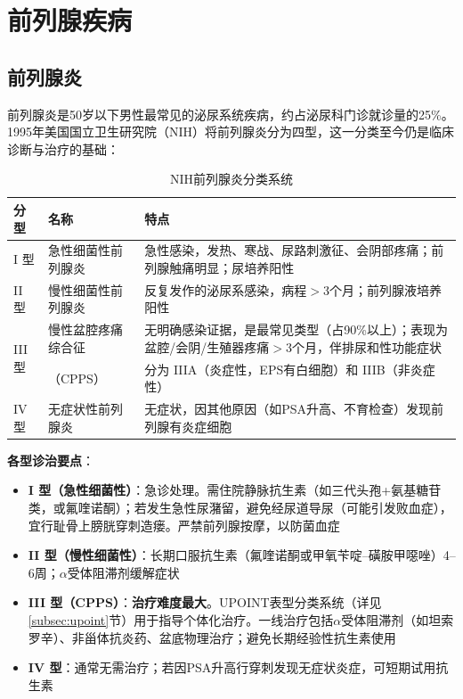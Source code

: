 \section{前列腺疾病}

\subsection{前列腺炎}

前列腺炎是50岁以下男性最常见的泌尿系统疾病，约占泌尿科门诊就诊量的25\%。1995年美国国立卫生研究院（NIH）将前列腺炎分为四型，这一分类至今仍是临床诊断与治疗的基础：

\begin{table}[htbp]
\centering
\caption{NIH前列腺炎分类系统}
\label{tab:prostatitis_nih}
\begin{tabularx}{\textwidth}{@{}llX@{}}
    \toprule
    \textbf{分型} & \textbf{名称} & \textbf{特点} \\
    \midrule
    I 型 & 急性细菌性前列腺炎 & 急性感染，发热、寒战、尿路刺激征、会阴部疼痛；前列腺触痛明显；尿培养阳性 \\
    II 型 & 慢性细菌性前列腺炎 & 反复发作的泌尿系感染，病程$>$3个月；前列腺液培养阳性 \\
    \multirow{2}{*}{III 型} & 慢性盆腔疼痛综合征 & 无明确感染证据，是最常见类型（占90\%以上）；表现为盆腔/会阴/生殖器疼痛$>$3个月，伴排尿和性功能症状 \\
     & （CPPS） & 分为 IIIA（炎症性，EPS有白细胞）和 IIIB（非炎症性） \\
    IV 型 & 无症状性前列腺炎 & 无症状，因其他原因（如PSA升高、不育检查）发现前列腺有炎症细胞 \\
    \bottomrule
\end{tabularx}
\end{table}

\textbf{各型诊治要点}：

\begin{itemize}[leftmargin=2cm]
	\item \textbf{I 型（急性细菌性）}：急诊处理。需住院静脉抗生素（如三代头孢+氨基糖苷类，或氟喹诺酮）；若发生急性尿潴留，避免经尿道导尿（可能引发败血症），宜行耻骨上膀胱穿刺造瘘。严禁前列腺按摩，以防菌血症
	\item \textbf{II 型（慢性细菌性）}：长期口服抗生素（氟喹诺酮或甲氧苄啶--磺胺甲噁唑）4--6周；$\alpha$受体阻滞剂缓解症状
	\item \textbf{III 型（CPPS）}：\textbf{治疗难度最大}。UPOINT表型分类系统（详见\ref{subsec:upoint}节）用于指导个体化治疗。一线治疗包括$\alpha$受体阻滞剂（如坦索罗辛）、非甾体抗炎药、盆底物理治疗；避免长期经验性抗生素使用
	\item \textbf{IV 型}：通常无需治疗；若因PSA升高行穿刺发现无症状炎症，可短期试用抗生素
\end{itemize}

